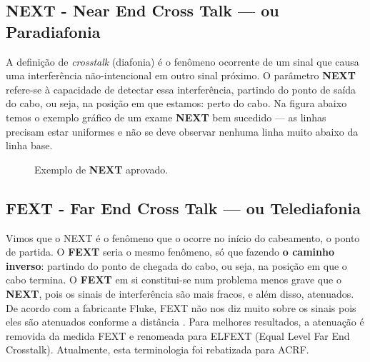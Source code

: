 \documentclass[	DIV=calc,%
							paper=a4,%
							fontsize=12pt,%
							onecolumn]{scrartcl}	 					%
\begin{document}
\subsection{NEXT - Near End Cross Talk --- ou Paradiafonia}
A definição de \textit{crosstalk} (diafonia) é o fenômeno ocorrente de um sinal que causa uma interferência não-intencional em outro sinal próximo. O parâmetro \textbf{NEXT} refere-se à capacidade de detectar essa interferência, partindo do ponto de saída do cabo, ou seja, na posição em que estamos: perto do cabo. Na figura abaixo temos o exemplo gráfico de um exame \textbf{NEXT} bem sucedido --- as linhas precisam estar uniformes e não se deve observar nenhuma linha muito abaixo da linha base.


\begin{figure}[H]
	\noindent{}
	\caption{Exemplo de \textbf{NEXT} aprovado. \cite{next}}
	\label{fig4}
\end{figure}


\subsection{FEXT - Far End Cross Talk --- ou Telediafonia}
Vimos que o NEXT é o fenômeno que o ocorre no início do cabeamento, o ponto de partida. O \textbf{FEXT} seria o mesmo fenômeno, só que fazendo \textbf{o caminho inverso}: partindo do ponto de chegada do cabo, ou seja, na posição em que o cabo termina. O \textbf{FEXT} em si constitui-se num problema menos grave que o \textbf{NEXT}, pois os sinais de interferência são mais fracos, e além disso, atenuados. De acordo com a fabricante Fluke, FEXT não nos diz muito sobre os sinais pois eles são atenuados conforme a distância \cite{understading}. Para melhores resultados, a atenuação é removida da medida FEXT e renomeada para ELFEXT (Equal Level Far End Crosstalk). Atualmente, esta terminologia foi rebatizada para ACRF. 
\end{document}
